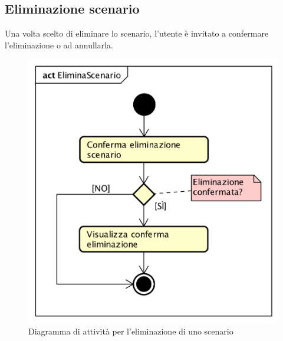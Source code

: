 \subsection{Eliminazione scenario}
Una volta scelto di eliminare lo scenario, l'utente è invitato a confermare l'eliminazione o ad annullarla.
\begin{figure}[H]
	\centering
	\includegraphics[scale=0.7]{img/DiagrammiDiAttivita/EliminazioneScenario.png}
	\caption{Diagramma di attività per l'eliminazione di uno scenario}
\end{figure}

\newpage
